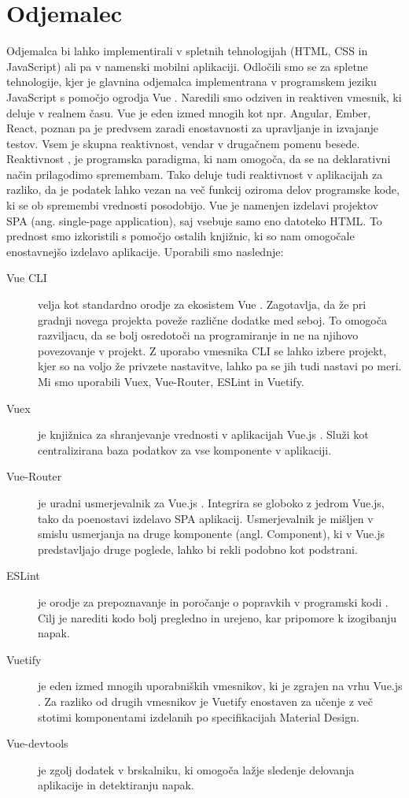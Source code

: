 \documentclass[a4paper, 12pt]{book}
\begin{document}
\section{Odjemalec}

Odjemalca bi lahko implementirali v spletnih tehnologijah (HTML, CSS in JavaScript) ali pa v namenski mobilni aplikaciji. Odločili smo se za spletne tehnologije, kjer je glavnina odjemalca implementrana v programskem jeziku JavaScript s pomočjo ogrodja Vue	.  Naredili smo odziven in reaktiven vmesnik, ki deluje v realnem času. Vue je eden izmed mnogih kot npr. Angular, Ember, React, poznan pa je predvsem zaradi enostavnosti za upravljanje in izvajanje testov. Vsem je skupna reaktivnost, vendar v drugačnem pomenu besede. Reaktivnost \cite{reaktivnost}, je programska paradigma, ki nam omogoča, da se na deklarativni način prilagodimo spremembam. Tako deluje tudi reaktivnost v aplikacijah za razliko, da je podatek lahko vezan na več funkcij oziroma delov programske kode, ki se ob spremembi vrednosti posodobijo. Vue je namenjen izdelavi projektov SPA (ang. single-page application), saj vsebuje samo eno datoteko HTML. To prednost smo izkoristili s pomočjo ostalih knjižnic, ki so nam omogočale enostavnejšo izdelavo aplikacije. Uporabili smo naslednje:
\begin{description}
\item[Vue CLI] velja kot standardno orodje za ekosistem Vue \cite{VueCLI}. Zagotavlja, da že pri gradnji novega projekta poveže različne dodatke med seboj. To omogoča razviljacu, da se bolj osredotoči na programiranje in ne na njihovo povezovanje v projekt. Z uporabo vmesnika CLI se lahko izbere projekt, kjer so na voljo že privzete nastavitve, lahko pa se jih tudi nastavi po meri. Mi smo uporabili Vuex, Vue-Router, ESLint in Vuetify.
\item[Vuex] je knjižnica za shranjevanje vrednosti v aplikacijah Vue.js \cite{Vuex}. Služi kot centralizirana baza podatkov za vse komponente v aplikaciji. 
\item[Vue-Router] je uradni usmerjevalnik za Vue.js \cite{VueRouter}. Integrira se globoko z jedrom Vue.js, tako da poenostavi izdelavo SPA aplikacij. Usmerjevalnik je mišljen v smislu usmerjanja na druge komponente (angl. Component), ki v Vue.js predstavljajo druge poglede, lahko bi rekli podobno kot podstrani.
\item[ESLint] je orodje za prepoznavanje in poročanje o popravkih v programski kodi \cite{ESLint}. Cilj je narediti kodo bolj pregledno in urejeno, kar pripomore k izogibanju napak.
\item[Vuetify] je eden izmed mnogih uporabniških vmesnikov, ki je zgrajen na vrhu Vue.js \cite{Vuetify}. Za razliko od drugih vmesnikov je Vuetify enostaven za učenje z več stotimi komponentami izdelanih po specifikacijah Material Design.
\item[Vue-devtools] je zgolj dodatek v brskalniku, ki omogoča lažje sledenje delovanja aplikacije in detektiranju napak. 
\end{description}
\end{document}
